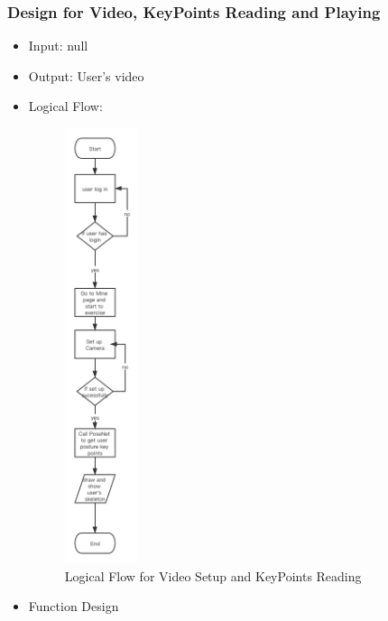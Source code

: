 \documentclass[16pt]{scrreprt}
\begin{document}
\subsubsection{Design for Video, KeyPoints Reading and Playing}
\begin{itemize}
    \item Input: null
    \item Output: User's video
    \item Logical Flow:
     \begin{figure}[H]
    \centering
    \includegraphics[width=0.2\textwidth]{diagrams/video.png}
    \caption{Logical Flow for Video Setup and KeyPoints Reading}
\end{figure}
    \item Function Design
    \begin{center}
    \begin{tabular}{p{6cm}p{10cm}}
        

\end{tabular}
\end{center}
\end{itemize}
\end{document}
